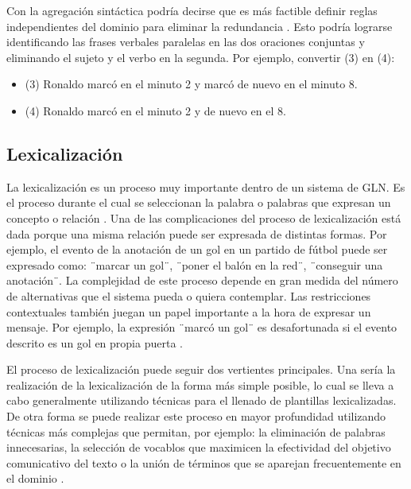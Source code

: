     Con la agregación sintáctica podría decirse que es más factible definir reglas independientes del dominio para eliminar la 
redundancia . Esto podría lograrse identificando las frases verbales paralelas en las dos oraciones conjuntas y eliminando el sujeto y el verbo en la segunda. 
Por ejemplo, convertir (3) en (4):

\begin{itemize}
    \item (3) Ronaldo marcó en el minuto 2 y marcó de nuevo en el minuto 8.
    \item (4) Ronaldo marcó en el minuto 2 y de nuevo en el 8.
\end{itemize}
    


\subsection{Lexicalización}\label{subsection:lexicalizacion}

    La lexicalización es un proceso muy importante dentro de un sistema de GLN. Es el proceso durante el cual se 
seleccionan la palabra o palabras que expresan un concepto o relaci\'on . Una de las 
complicaciones del proceso de lexicalización est\'a dada porque una misma relación puede ser expresada de 
distintas formas. Por ejemplo, el evento de la anotación de un gol en un partido de fútbol puede ser expresado como:
¨marcar un gol¨, ¨poner el balón en la red¨, ¨conseguir una anotación¨. La complejidad de este proceso depende en gran 
medida del número de alternativas que el sistema pueda o quiera contemplar. Las restricciones contextuales también juegan 
un papel importante a la hora de expresar un mensaje. Por ejemplo, la expresión ¨marcó un gol¨ es desafortunada si el evento 
descrito es un gol en propia puerta .

    El proceso de lexicalización puede seguir dos vertientes principales. Una ser\'ia la realizaci\'on de la  
lexicalización de la forma m\'as simple posible, lo cual se lleva a cabo generalmente utilizando t\'ecnicas para el llenado de 
plantillas lexicalizadas. De otra forma se puede realizar este proceso en mayor profundidad utilizando t\'ecnicas m\'as complejas  
que permitan, por ejemplo: la eliminaci\'on de palabras innecesarias, la selección de vocablos que maximicen la efectividad del objetivo 
comunicativo del texto o la uni\'on de t\'erminos que se aparejan frecuentemente en el dominio .

